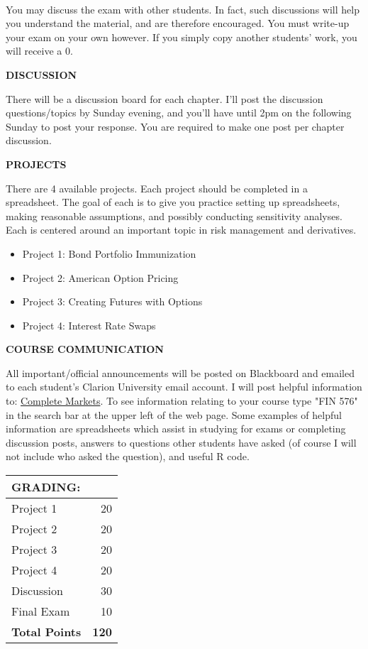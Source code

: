 \documentclass[11pt]{article}
\begin{document}
\\
You may discuss the exam with other students.  In fact, such discussions will help you understand the material, and are therefore encouraged.  You must write-up your exam on your own however.  If you simply copy another students' work, you will receive a 0.
\begin{center}
\textbf{DISCUSSION}
\end{center}
There will be a discussion board for each chapter.  I'll post the discussion questions/topics by Sunday evening, and you'll have until 2pm on the following Sunday to post your response.  You are required to make one post per chapter discussion.  
\begin{center}
\textbf{PROJECTS}
\end{center}
There are 4 available projects.  Each project should be completed in a spreadsheet. The goal of each is to give you practice setting up spreadsheets, making reasonable assumptions, and possibly conducting sensitivity analyses.  Each is centered around an important topic in risk management and derivatives.
\begin{itemize}
\item Project 1:  Bond Portfolio Immunization \\
\item Project 2:  American Option Pricing \\
\item Project 3:  Creating Futures with Options\\
\item Project 4:  Interest Rate Swaps
\end{itemize}
\begin{center}
\textbf{COURSE COMMUNICATION}
\end{center}
All important/official announcements will be posted on Blackboard and emailed to each student's Clarion University email account.  I will post helpful information to: \href{http://www.complete-markets.com}{Complete Markets}. To see information relating to your course type "FIN 576" in the search bar at the upper left of the web page.  Some examples of helpful information are spreadsheets which assist in studying for exams or completing discussion posts, answers to questions other students have asked (of course I will not include who asked the question), and useful R code.

\begin{center}
\begin{tabular}{lr}
\textbf{GRADING:} & \\
\hline
Project 1 & 20\\
Project 2 & 20\\
Project 3 & 20\\
Project 4 & 20\\
Discussion & 30\\
Final Exam & 10\\
\hline
\textbf{Total Points} & \textbf{120}\\
\hline
\end{tabular}
\end{center}
\end{document}
